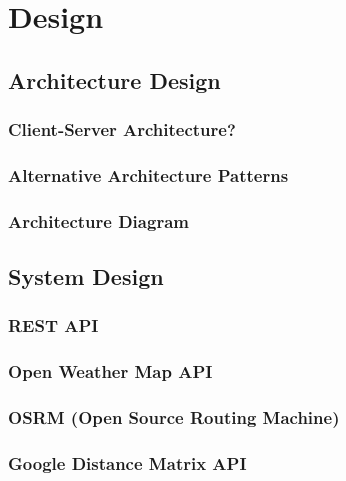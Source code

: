 \chapter{Design}
\label{chap:design}

\section{Architecture Design}
\label{design:architecture}

\subsection{Client-Server Architecture?}
\label{architecture:client-server}

\subsection{Alternative Architecture Patterns}
\label{architecture:alt}

\subsection{Architecture Diagram}
\label{architecture:diagram}

\section{System Design}
\label{design:sysdesign}

\subsection{REST API}
\label{sysdesign:restapi}

\subsection{Open Weather Map API}
\label{sysdesign:owm-api}

\subsection{OSRM (Open Source Routing Machine)}
\label{sysdesign:osrm}

\subsection{Google Distance Matrix API}
\label{sysdesign:google-distance-matrix-api}

